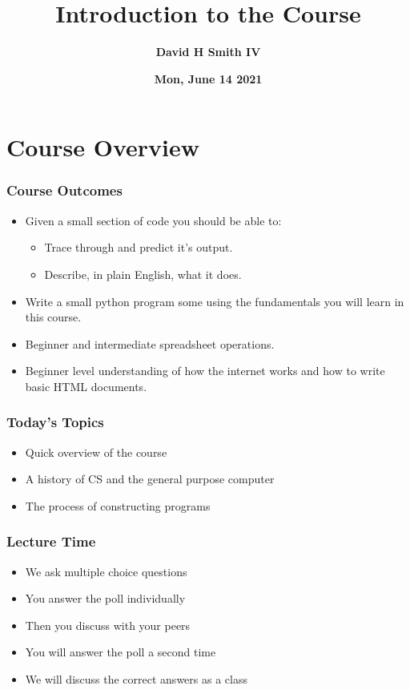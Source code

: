 \documentclass{beamer}
\title{\textbf{Introduction to the Course}}
\author{\textbf{David H Smith IV}}
\institute[\textbf{UIUC}]{\textbf{University of Illinois Urbana-Champaign}}
\date{\textbf{Mon, June 14 2021}}
\begin{document}
\frame{\titlepage}

\section{Course Overview}

%
%
\begin{frame}
  \frametitle{Course Outcomes}
  \begin{itemize}
    \item Given a small section of code you should be able to:
      \begin{itemize}
        \item Trace through and predict it's output.
        \item Describe, in plain English, what it does.
      \end{itemize}
    \item Write a small python program some using the fundamentals you will learn in this course.
    \item Beginner and intermediate spreadsheet operations.
    \item Beginner level understanding of how the internet works and how to write basic HTML documents.
  \end{itemize}
\end{frame}

\begin{frame}
  \frametitle{Today's Topics}
  \begin{itemize}
    \item Quick overview of the course 
    \item A history of CS and the general purpose computer
    \item The process of constructing programs
  \end{itemize}
\end{frame}

\begin{frame}
  \frametitle{Lecture Time}
  \begin{itemize}
    \item We ask multiple choice questions
    \item You answer the poll individually
    \item Then you discuss with your peers 
    \item You will answer the poll a second time
    \item We will discuss the correct answers as a class
  \end{itemize}
\end{frame}
\end{document}
